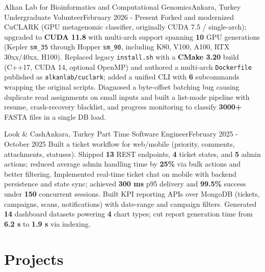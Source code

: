     \resumeSubheading
  {Alkan Lab for Bioinformatics and Computational Genomics}{Ankara, Turkey}
  {Undergraduate Volunteer}{February 2026 - Present}
  \resumeItemListStart
        {Forked and modernized CuCLARK (GPU metagenomic classifier, originally CUDA 7.5 / single-arch); upgraded to \textbf{CUDA 11.8} with multi-arch support spanning \textbf{10} GPU generations (Kepler \texttt{sm\_35} through Hopper \texttt{sm\_90}, including K80, V100, A100, RTX 30xx/40xx, H100).}
        {Replaced legacy \texttt{install.sh} with a \textbf{CMake 3.20} build (C++17, CUDA 14, optional OpenMP) and authored a multi-arch \texttt{Dockerfile} published as \texttt{alkanlab/cuclark}; added a unified CLI with \textbf{6} subcommands wrapping the original scripts.}
        {Diagnosed a byte-offset batching bug causing duplicate read assignments on small inputs and built a list-mode pipeline with resume, crash-recovery blacklist, and progress monitoring to classify \textbf{3000+} FASTA files in a single DB load.}
    \resumeItemListEnd

    \resumeSubheading
  {Look \& Cash}{Ankara, Turkey}
  {Part Time Software Engineer}{February 2025 - October 2025}
  \resumeItemListStart
        {Built a ticket workflow for web/mobile (priority, comments, attachments, statuses). Shipped \textbf{13} REST endpoints, \textbf{4} ticket states, and \textbf{5} admin actions; reduced average admin handling time by \textbf{25\%} via bulk actions and better filtering.}
        {Implemented real-time ticket chat on mobile with backend persistence and state sync; achieved \textbf{300 ms} p95 delivery and \textbf{99.5\%} success under \textbf{150} concurrent sessions.}
        {Built KPI reporting APIs over MongoDB (tickets, campaigns, scans, notifications) with date-range and campaign filters. Generated \textbf{14} dashboard datasets powering \textbf{4} chart types; cut report generation time from \textbf{6.2 s} to \textbf{1.9 s} via indexing.}
    \resumeItemListEnd

  \resumeSubHeadingListEnd


\section{Projects}
  \resumeSubHeadingListStart

